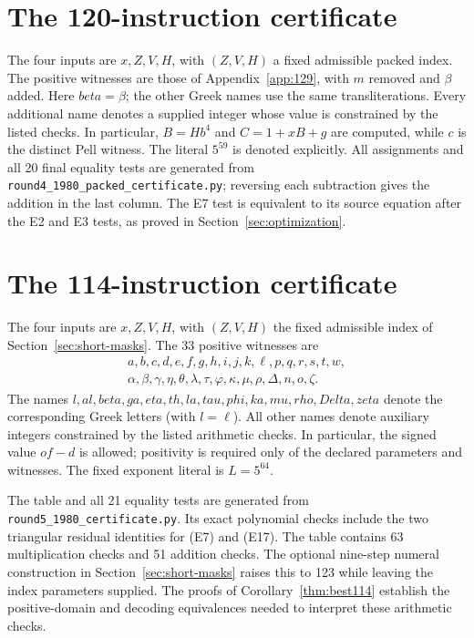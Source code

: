 \documentclass[11pt,letterpaper]{article}
\theoremstyle{definition}
\theoremstyle{remark}
\numberwithin{equation}{section}
\newcommand{\file}[1]{\texttt{#1}}
\begin{document}
\small


\normalsize
\section{The 120-instruction certificate}\label{app:120}

The four inputs are $x,Z,V,H$, with $(Z,V,H)$ a fixed admissible packed
index. The positive witnesses are those of Appendix~\ref{app:129}, with
$m$ removed and $\beta$ added. Here $\mathit{beta}=\beta$;
the other Greek names use the same transliterations. Every additional
name denotes a supplied integer whose value is constrained by the listed
checks. In particular, $B=Hb^4$ and $C=1+xB+g$ are computed, while $c$
is the distinct Pell witness. The literal $5^{59}$ is denoted explicitly.
All assignments and all 20 final equality tests are generated from
\file{round4\_1980\_packed\_certificate.py}; reversing each subtraction
gives the addition in the last column. The E7 test is equivalent to its
source equation after the E2 and E3 tests, as proved in
Section~\ref{sec:optimization}.

\small


\normalsize
\section{The 114-instruction certificate}\label{app:114}

The four inputs are $x,Z,V,H$, with $(Z,V,H)$ the fixed admissible index
of Section~\ref{sec:short-masks}. The 33 positive witnesses are
\[
\begin{gathered}
 a,b,c,d,e,f,g,h,i,j,k,\ell,p,q,r,s,t,w,\\
 \alpha,\beta,\gamma,\eta,\theta,\lambda,\tau,\varphi,
 \kappa,\mu,\rho,\Delta,n,o,\zeta.
\end{gathered}
\]
The names $\mathit{l},\mathit{al},\mathit{beta},\mathit{ga},
\mathit{eta},\mathit{th},\mathit{la},\mathit{tau},\mathit{phi},
\mathit{ka},\mathit{mu},\mathit{rho},\mathit{Delta},\mathit{zeta}$
denote the corresponding Greek letters (with $\mathit l=\ell$).
All other names denote auxiliary integers constrained by the listed
arithmetic checks. In particular, the signed value $of-d$ is allowed;
positivity is required only of the declared parameters and witnesses.
The fixed exponent literal is $L=5^{64}$.

The table and all 21 equality tests are generated from
\file{round5\_1980\_certificate.py}. Its exact polynomial checks include
the two triangular residual identities for (E7) and (E17). The table
contains 63 multiplication checks and 51 addition checks. The optional
nine-step numeral construction in Section~\ref{sec:short-masks} raises
this to 123 while leaving the index parameters supplied. The proofs of
Corollary~\ref{thm:best114} establish the positive-domain and decoding
equivalences needed to interpret these arithmetic checks.
\end{document}
